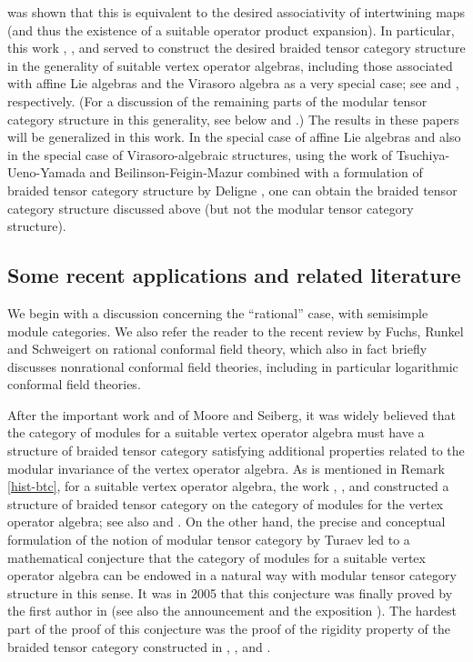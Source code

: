 \documentclass[12pt]{article}
\begin{document}
\begin{rema}
{was shown that this is equivalent to the desired associativity of
intertwining maps (and thus the existence of a suitable operator
product expansion).  In particular, this work \cite{tensor1},
\cite{tensor2}, \cite{tensor3} and \cite{tensor4} served to construct
the desired braided tensor category structure in the generality of
suitable vertex operator algebras, including those associated with
affine Lie algebras and the Virasoro algebra as a very special case;
see \cite{HLaffine} and \cite{H3}, respectively.  (For a discussion of
the remaining parts of the modular tensor category structure in this
generality, see below and \cite{Hfinitetensor}.)  The results in these
papers will be generalized in this work.  In the special case of
affine Lie algebras and also in the special case of Virasoro-algebraic
structures, using the work of Tsuchiya-Ueno-Yamada \cite{TUY} and
Beilinson-Feigin-Mazur \cite{BFM} combined with a formulation of
braided tensor category structure by Deligne \cite{De}, one can obtain
the braided tensor category structure discussed above (but not the
modular tensor category structure).  }
\end{rema}

\subsection{Some recent applications and related literature}\label{literature}

We begin with a discussion concerning the ``rational'' case, with
semisimple module categories.  We also refer the reader to the recent
review by Fuchs, Runkel and Schweigert \cite{FRS} on rational
conformal field theory, which also in fact briefly discusses
nonrational conformal field theories, including in particular
logarithmic conformal field theories.

After the important work \cite{MS1} and \cite{MS} of Moore and
Seiberg, it was widely believed that the category of modules for a
suitable vertex operator algebra must have a structure of braided
tensor category satisfying additional properties related to the
modular invariance of the vertex operator algebra. As is mentioned in
Remark \ref{hist-btc}, for a suitable vertex operator algebra, the
work \cite{tensor1}, \cite{tensor2}, \cite{tensor3} and \cite{tensor4}
constructed a structure of braided tensor category on the category of
modules for the vertex operator algebra; see also \cite{H3} and
\cite{HLaffine}.  On the other hand, the precise and conceptual
formulation of the notion of modular tensor category by Turaev
\cite{T1} led to a mathematical conjecture that the category of
modules for a suitable vertex operator algebra can be endowed in a
natural way with modular tensor category structure in this sense. It
was in 2005 that this conjecture was finally proved by the first
author in \cite{rigidity} (see also the announcement \cite{HPNAS} and
the exposition \cite{Hconference}).  The hardest part of the proof of
this conjecture was the proof of the rigidity property of the braided
tensor category constructed in \cite{tensor1}, \cite{tensor2},
\cite{tensor3} and \cite{tensor4}.
\end{document}
